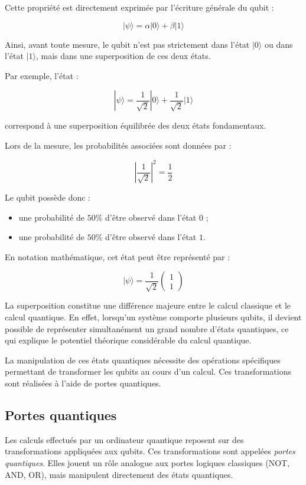 \documentclass[a4paper,12pt]{article}
\begin{document}
Cette propriété est directement exprimée par l’écriture générale du qubit :

\[
|\psi\rangle
=
\alpha |0\rangle
+
\beta |1\rangle
\]

Ainsi, avant toute mesure, le qubit n’est pas strictement dans l’état $|0\rangle$ ou dans l’état $|1\rangle$, mais dans une superposition de ces deux états.

Par exemple, l’état :

\[
|\psi\rangle
=
\frac{1}{\sqrt{2}}|0\rangle
+
\frac{1}{\sqrt{2}}|1\rangle
\]

correspond à une superposition équilibrée des deux états fondamentaux.

Lors de la mesure, les probabilités associées sont données par :

\[
\left|
\frac{1}{\sqrt{2}}
\right|^2
=
\frac{1}{2}
\]

Le qubit possède donc :

\begin{itemize}
    \item une probabilité de $50\%$ d’être observé dans l’état $0$ ;
    \item une probabilité de $50\%$ d’être observé dans l’état $1$.
\end{itemize}

En notation mathématique, cet état peut être représenté par :

\[
|\psi\rangle
=
\frac{1}{\sqrt{2}}
\begin{pmatrix}
1\\
1
\end{pmatrix}
\]

La superposition constitue une différence majeure entre le calcul classique et le calcul quantique. En effet, lorsqu’un système comporte plusieurs qubits, il devient possible de représenter simultanément un grand nombre d’états quantiques, ce qui explique le potentiel théorique considérable du calcul quantique.

La manipulation de ces états quantiques nécessite des opérations spécifiques permettant de transformer les qubits au cours d’un calcul. Ces transformations sont réalisées à l’aide de portes quantiques.

\subsection{Portes quantiques}

Les calculs effectués par un ordinateur quantique reposent sur des transformations appliquées aux qubits. Ces transformations sont appelées \textit{portes quantiques}. Elles jouent un rôle analogue aux portes logiques classiques (NOT, AND, OR), mais manipulent directement des états quantiques.
\end{document}
